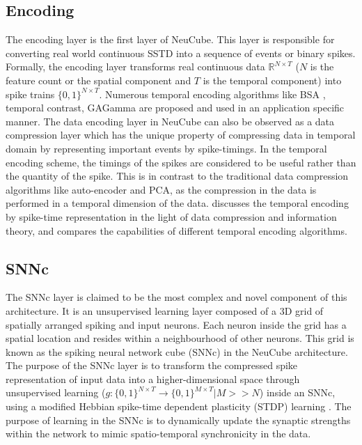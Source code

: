 \subsection{Encoding}
The encoding layer is the first layer of NeuCube. This layer is responsible for converting real world continuous SSTD into a sequence of events or binary spikes. Formally, the encoding layer transforms real continuous data $\mathbb{R}^{N\times T}$ ($N$ is the feature count or the spatial component and $T$ is the temporal component) into spike trains $\lbrace 0,1 \rbrace^{N\times T}$. Numerous temporal encoding algorithms like BSA \citep{schrauwen2003bsa}, temporal contrast, GAGamma  \citep{sengupta2015framework} are proposed and used in an application specific manner. The data encoding layer in NeuCube can also be observed as a data compression layer which has the unique property of compressing data in temporal domain by representing important events by spike-timings. In the temporal encoding scheme, the timings of the spikes are considered to be useful rather than the quantity of the spike. This is  in contrast to the traditional data compression algorithms like auto-encoder and PCA, as the compression in the data is performed in a temporal dimension of the data. \citet{sengupta2017spike} discusses the temporal encoding by spike-time representation in the light of data compression and information theory, and compares the capabilities of different temporal encoding algorithms. 

\subsection{SNNc}
The SNNc layer is claimed to be the most complex and novel component of this architecture. It is an unsupervised learning layer composed of a 3D grid of spatially arranged spiking and input neurons. Each neuron inside the grid has a spatial location and resides within a neighbourhood of other neurons. This grid is known as the spiking neural network cube (SNNc) in the NeuCube architecture. The purpose of the SNNc layer is to transform the compressed spike representation of input data into a higher-dimensional space through unsupervised learning ($g:\lbrace 0,1 \rbrace^{N \times T}\rightarrow \lbrace 0, 1 \rbrace^{M \times T}| M>>N$) inside an SNNc, using a modified Hebbian spike-time dependent plasticity (STDP) learning \citep{song2000competitive}. The purpose of learning in the SNNc is to dynamically update the synaptic strengths within the network to mimic spatio-temporal synchronicity in the data. 

